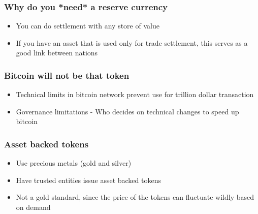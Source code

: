 \documentclass{beamer}
\begin{document}
\begin{frame}
  \frametitle{Why do you *need* a reserve currency}
  \begin{itemize}
  \item You can do settlement with any store of value
    \item If you have an asset that is used only for trade settlement,
      this serves as a good link between nations
  \end{itemize}
\end{frame}
\begin{frame}
  \frametitle{Bitcoin will not be that token}
  \begin{itemize}
    \item Technical limits in bitcoin network prevent use for trillion
      dollar transaction
    \item Governance limitations - Who decides on technical changes to
      speed up bitcoin
  \end{itemize}
\end{frame}
\begin{frame}
  \frametitle{Asset backed tokens}
  \begin{itemize}
  \item Use precious metals (gold and silver)
  \item Have trusted entities issue asset backed tokens
    \item Not a gold standard, since the price of the tokens can
      fluctuate wildly based on demand
  \end{itemize}
\end{frame}
\end{document}
